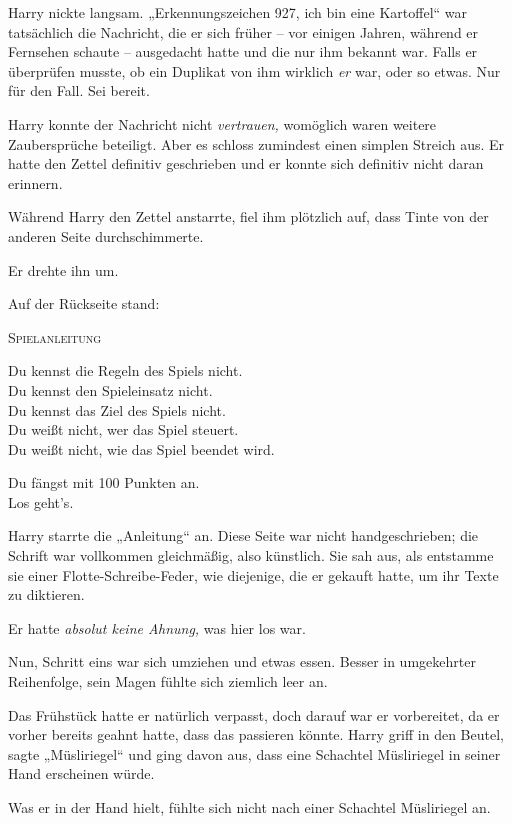 Harry nickte langsam. „Erkennungszeichen 927, ich bin eine Kartoffel“ war tatsächlich die Nachricht, die er sich früher – vor einigen Jahren, während er Fernsehen schaute – ausgedacht hatte und die nur ihm bekannt war. Falls er überprüfen musste, ob ein Duplikat von ihm wirklich \emph{er} war, oder so etwas. Nur für den Fall. Sei bereit. 

Harry konnte der Nachricht nicht \emph{vertrauen,} womöglich waren weitere Zaubersprüche beteiligt. Aber es schloss zumindest einen simplen Streich aus. Er hatte den Zettel definitiv geschrieben und er konnte sich definitiv nicht daran erinnern. 

Während Harry den Zettel anstarrte, fiel ihm plötzlich auf, dass Tinte von der anderen Seite durchschimmerte. 

Er drehte ihn um. 

Auf der Rückseite stand: 

\begin{writtenNote}\centering
\textsc{Spielanleitung}

Du kennst die Regeln des Spiels nicht.\\
Du kennst den Spieleinsatz nicht.\\
Du kennst das Ziel des Spiels nicht.\\
Du weißt nicht, wer das Spiel steuert.\\
Du weißt nicht, wie das Spiel beendet wird.

Du fängst mit 100 Punkten an.\\
Los geht's.
\end{writtenNote}

Harry starrte die „Anleitung“ an. Diese Seite war nicht handgeschrieben; die Schrift war vollkommen gleichmäßig, also künstlich. Sie sah aus, als entstamme sie einer Flotte-Schreibe-Feder, wie diejenige, die er gekauft hatte, um ihr Texte zu diktieren. 

Er hatte \emph{absolut keine Ahnung,} was hier los war. 

Nun, Schritt eins war sich umziehen und etwas essen. Besser in umgekehrter Reihenfolge, sein Magen fühlte sich ziemlich leer an. 

Das Frühstück hatte er natürlich verpasst, doch darauf war er vorbereitet, da er vorher bereits geahnt hatte, dass das passieren könnte. Harry griff in den Beutel, sagte „Müsliriegel“ und ging davon aus, dass eine Schachtel Müsliriegel in seiner Hand erscheinen würde.

Was er in der Hand hielt, fühlte sich nicht nach einer Schachtel Müsliriegel an.

